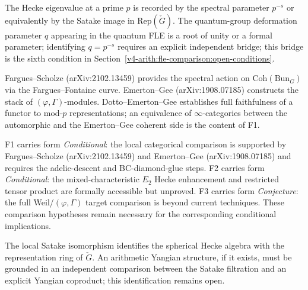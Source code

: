 \begin{remark}
\label{v4-arith:fle-comparison:rem:q-vs-ps}
The Hecke eigenvalue at a prime \(p\) is recorded by the spectral
parameter \(p^{-s}\) or equivalently by the Satake image in
\(\mathrm{Rep}(\check G)\). The quantum-group deformation parameter
\(q\) appearing in the quantum FLE is a root of unity or a formal
parameter; identifying \(q = p^{-s}\) requires an explicit independent
bridge; this bridge is the sixth condition in
Section~\ref{v4-arith:fle-comparison:open-conditions}.
\end{remark}

\begin{remark}
\label{v4-arith:fle-comparison:rem:fs-eg-deg}
Fargues--Scholze (arXiv:2102.13459) provides the spectral action on
\(\mathrm{Coh}(\mathrm{Bun}_{G})\) via the Fargues--Fontaine curve.
Emerton--Gee (arXiv:1908.07185) constructs the stack of
\((\varphi,\Gamma)\)-modules. Dotto--Emerton--Gee establishes full
faithfulness of a functor to mod-\(p\) representations; an
equivalence of \(\infty\)-categories between the automorphic and the
Emerton--Gee coherent side is the content of F1.
\end{remark}

\begin{remark}
\label{v4-arith:fle-comparison:rem:f123-form}
F1 carries form \emph{Conditional}: the local categorical
comparison is supported by Fargues--Scholze (arXiv:2102.13459) and
Emerton--Gee (arXiv:1908.07185) and requires the adelic-descent
and BC-diamond-glue steps. F2 carries form
\emph{Conditional}: the mixed-characteristic \(E_{2}\) Hecke
enhancement and restricted tensor product are formally accessible but
unproved. F3 carries form \emph{Conjecture}: the full
Weil/\((\varphi,\Gamma)\) target comparison is beyond current
techniques. These comparison hypotheses remain necessary for the
corresponding conditional implications.
\end{remark}

\begin{remark}
\label{v4-arith:fle-comparison:rem:satake-yangian}
The local Satake isomorphism identifies the spherical Hecke algebra
with the representation ring of \(\check G\). An arithmetic Yangian
structure, if it exists, must be grounded in an independent
comparison between the Satake filtration and an explicit Yangian
coproduct; this identification remains open.
\end{remark}


